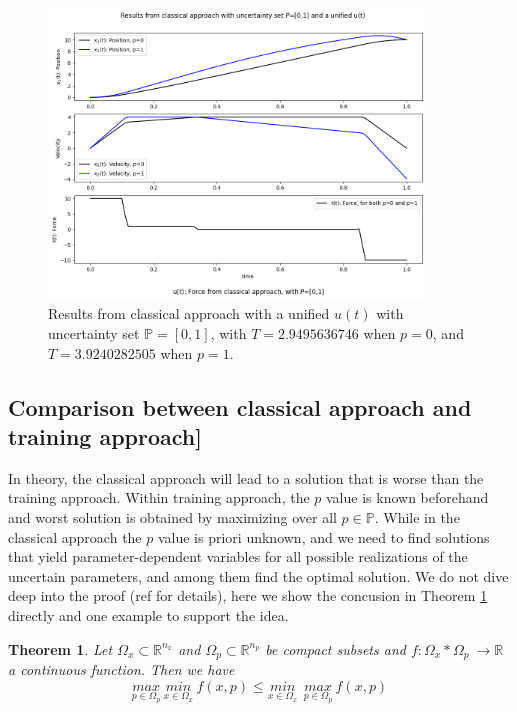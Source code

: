 \documentclass  [
  paper    = a4,
  BCOR     = 10mm,
  twoside,
  fontsize = 12pt,
  fleqn,
  toc      = bibnumbered,
  toc      = listofnumbered,
  numbers  = noendperiod,
  headings = normal,
  listof   = leveldown,
  version  = 3.03
]                                       {scrreprt}
\newcommand{\<}{\langle}
\renewcommand{\>}{\rangle}
\newtheorem{theorem}{Theorem}
\begin{document}
 \begin{figure}[H]
  	\centerline{\includegraphics[width=10cm]{aunified_ut.png}}
  	\caption{Results from classical approach with a unified $u(t)$ with uncertainty set  $ \mathbb{P}=[0,1]$, with $T=2.9495636746$ when $p=0$, and $T=3.9240282505$ when $p=1$. }
  	\label{fig1_ca_unifiedUt}
  \end{figure}
  
  
\subsection{Comparison between classical approach and training approach]}
\label{Comparison}

In theory, the classical approach will lead to a solution that is worse than the training approach. Within training approach, the $p$ value is known beforehand and worst solution is obtained by maximizing over all $p \in \mathbb{P}$. While in the classical approach the $p$ value is priori unknown, and we need to find solutions that yield parameter-dependent variables for all possible realizations of the uncertain parameters, and among them find the optimal solution. We do not dive deep into the proof (ref \cite{MatSch22} for details), here we show the concusion in Theorem \ref{Theorem_compare} directly and one example to support the idea. 

\begin{theorem} Let $\Omega_x \subset \mathbb{R}^{n_x}$ and $\Omega_p \subset \mathbb{R}^{n_p}$ be compact subsets and $f : \Omega_x *  \Omega_p \  \rightarrow \mathbb{R}$ a continuous function. Then we have
	\begin{equation}
	\underset{p \in \Omega_p}{max}\ \underset{x \in \Omega_x}{min}\ f (x,p) \leq \underset{x \in \Omega_x}{min}\ \ \underset{p \in \Omega_p}{max}\ f (x,p)
	\end{equation}
\label{Theorem_compare}
\end{theorem}
\end{document}
